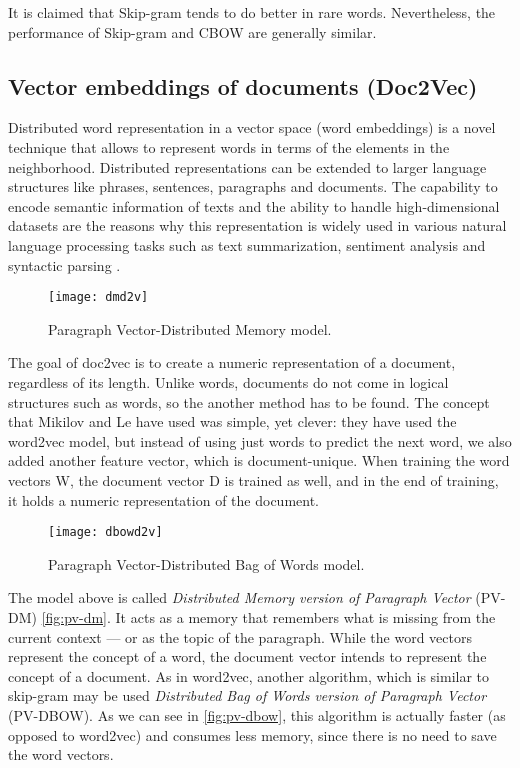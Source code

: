 It is claimed that Skip-gram tends to do better in rare words. Nevertheless, the performance of Skip-gram and CBOW are generally similar.

\subsection{Vector embeddings of documents (Doc2Vec)}

Distributed word representation in a vector space (word embeddings) is a novel technique that allows to represent words in terms of the elements in the neighborhood.
Distributed representations can be extended to larger language structures like phrases, sentences, paragraphs and documents. The capability to encode semantic information of texts and the ability to handle high-dimensional datasets are the reasons why this representation is widely used in various natural language processing tasks such as text summarization, sentiment analysis and syntactic parsing \cite{le2014distributed}.

\begin{figure}[ht]
	\centering
	\texttt{[image: dmd2v]}
	\caption[Paragraph vector distributed memory model example]{Paragraph Vector-Distributed Memory model.}
	\label{fig:pv-dm}
\end{figure}

The goal of doc2vec is to create a numeric representation of a document, regardless of its length.
Unlike words, documents do not come in logical structures such as words, so the another method has to be found.
The concept that Mikilov and Le \cite{le2014distributed} have used was simple, yet clever: they have used the word2vec model, but instead of using just words to predict the next word, we also added another feature vector, which is document-unique.
When training the word vectors W, the document vector D is trained as well, and in the end of training, it holds a numeric representation of the document.

\begin{figure}[ht]
	\centering
	\texttt{[image: dbowd2v]}
	\caption[Paragraph vector distributed bag of words model example]{Paragraph Vector-Distributed Bag of Words model.}
	\label{fig:pv-dbow}
\end{figure}

The model above is called \textit{Distributed Memory version of Paragraph Vector} (PV-DM) \autoref{fig:pv-dm}. It acts as a memory that remembers what is missing from the current context — or as the topic of the paragraph. While the word vectors represent the concept of a word, the document vector intends to represent the concept of a document.
As in word2vec, another algorithm, which is similar to skip-gram may be used \textit{Distributed Bag of Words version of Paragraph Vector} (PV-DBOW).
As we can see in \autoref{fig:pv-dbow}, this algorithm is actually faster (as opposed to word2vec) and consumes less memory, since there is no need to save the word vectors.
